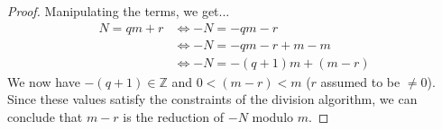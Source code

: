 \documentclass[12pt]{article}
\newcommand{\Z}{\mathbb{Z}}
\begin{document}
\begin{enumerate}
\begin{proof}
    Manipulating the terms, we get...
    \begin{align*}
      N = qm + r &\iff -N = -qm - r \\
                 &\iff -N = -qm - r + m - m \\
                 &\iff -N = -(q+1)m + (m-r)
    \end{align*}
    We now have \(-(q+1) \in \Z\) and \(0 < (m-r) < m\) (\(r\) assumed to be \(\neq 0\)).  Since these values satisfy the constraints of the division algorithm, we can conclude that \(m-r\) is the reduction of \(-N\) modulo \(m\).
  \end{proof}
  
\end{enumerate}
\end{document}
